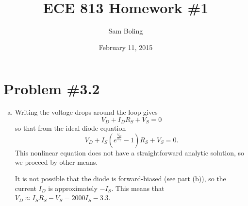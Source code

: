 \documentclass{article}
\title{ECE 813 Homework \#1}
\author{Sam Boling}
\date{February 11, 2015}
\begin{document}
\maketitle

\section*{Problem \#3.2}

\begin{enumerate}[(a)]
  \item{
    Writing the voltage drops around the loop gives
    $$
    V_D + I_D R_S + V_S = 0
    $$
    so that from the ideal diode equation
    $$
    V_D + I_S (e^{\frac{V_D}{\phi_T}} - 1)R_S + V_S = 0.
    $$
    This nonlinear equation does not have a straightforward analytic
    solution, so we proceed by other means.

    It is not possible that the diode is forward-biased (see part
    (b)), so the current $I_D$ is approximately $-I_S$. This means
    that $V_D \approx I_S R_S - V_S = 2000 I_S - 3.3$.

}
\end{enumerate}
\end{document}
